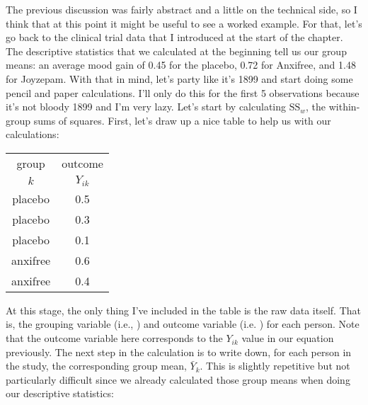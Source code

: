 
The previous discussion was fairly abstract and a little on the technical side, so I think that at this point it might be useful to see a worked example. For that, let's go back to the clinical trial data that I introduced at the start of the chapter. The descriptive statistics that we calculated at the beginning tell us our group means: an average mood gain of 0.45 for the placebo, 0.72 for Anxifree, and 1.48 for Joyzepam. With that in mind, let's party like it's 1899  and  start doing some pencil and paper calculations. I'll only do this for the first 5 observations because it's not bloody 1899 and I'm very lazy. Let's start by calculating $\mbox{SS}_{w}$, the within-group sums of squares. First, let's draw up a nice table to help us with our calculations: 

\small
\vspace*{6pt}
\begin{tabular}{c|c} %
{group} & {outcome}  \\ %
  $k$ &  $Y_{ik}$ \\ \hline %
{placebo}  & {0.5}  \\%
{placebo}  & {0.3} \\%
{placebo}  &  {0.1}\\%
{anxifree}  & {0.6} \\%
{anxifree}  & {0.4}\\%
\end{tabular}
\vspace*{6pt}
\normalsize

\noindent
At this stage, the only thing I've included in the table is the raw data itself. That is, the grouping variable (i.e., ) and outcome variable (i.e. ) for each person. Note that the outcome variable here corresponds to the $Y_{ik}$ value in our equation previously. The next step in the calculation is to write down, for each person in the study, the corresponding group mean, $\bar{Y}_k$. This is slightly repetitive but not particularly difficult since we already calculated those group means when doing our descriptive statistics:


